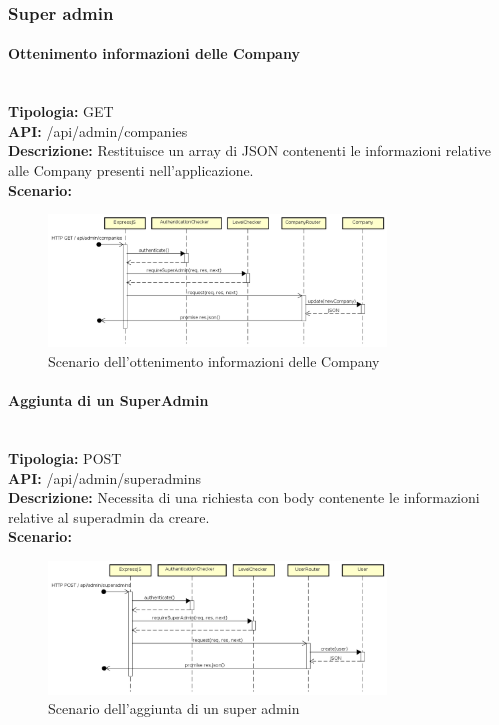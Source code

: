 \newpage
\subsubsection{Super admin}
\paragraph{Ottenimento informazioni delle Company}\mbox{}\\
\textbf{Tipologia:} GET \\
\textbf{API:} /api/admin/companies \\
\textbf{Descrizione:} Restituisce un array di JSON contenenti le informazioni relative alle Company presenti nell'applicazione. \\
\textbf{Scenario:} 
\begin{figure}[H]
\centering
\includegraphics[width=0.8\textwidth]{res/sections/backend/sequence/(GET)companySA.png}
\caption{Scenario dell'ottenimento informazioni delle Company}
\end{figure}

\newpage
\paragraph{Aggiunta di un SuperAdmin}\mbox{}\\
\textbf{Tipologia:} POST \\
\textbf{API:} /api/admin/superadmins \\
\textbf{Descrizione:} Necessita di una richiesta con body contenente le informazioni relative al superadmin da creare. \\
\textbf{Scenario:} 
\begin{figure}[H]
\centering
\includegraphics[width=0.8\textwidth]{res/sections/backend/sequence/(POST)superadmin.png}
\caption{Scenario dell'aggiunta di un super admin}
\end{figure}

